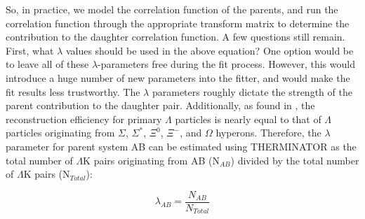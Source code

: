 \documentclass[ALICE,manyauthors]{cernphprep}
\begin{document}
So, in practice, we model the correlation function of the parents, and run the correlation function through the appropriate transform matrix to determine the contribution to the daughter correlation function.  A few questions still remain.  First, what $\lambda$ values should be used in the above equation?  One option would be to leave all of these $\lambda$-parameters free during the fit process.  However, this would introduce a huge number of new parameters into the fitter, and would make the fit results less trustworthy.  The $\lambda$ parameters roughly dictate the strength of the parent contribution to the daughter pair.  Additionally, as found in \cite{Salzwedel:2241303}, the reconstruction efficiency for primary $\Lambda$ particles is nearly equal to that of $\Lambda$ particles originating from $\Sigma$, $\Sigma^{*}$, $\Xi^{0}$, $\Xi^{-}$, and $\Omega$ hyperons.  Therefore, the $\lambda$ parameter for parent system AB can be estimated using THERMINATOR as the total number of $\Lambda$K pairs originating from AB (N$_{AB}$) divided by the total number of $\Lambda$K pairs (N$_{Total}$):

\begin{equation}
\lambda_{AB} = \frac{N_{AB}}{N_{Total}}
\end{equation}
\end{document}
